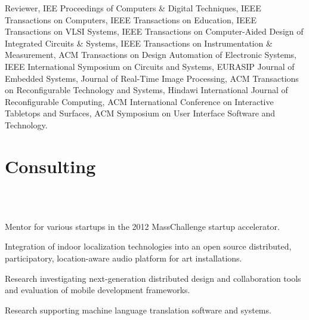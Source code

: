 \documentclass[line]{res}
\begin{document}
\begin{resume}
	Reviewer, IEE Proceedings of Computers \& Digital Techniques, IEEE Transactions on Computers, IEEE Transactions on Education, IEEE Transactions on VLSI Systems, IEEE Transactions on Computer-Aided Design of Integrated Circuits \& Systems, IEEE Transactions on Instrumentation \& Measurement, ACM Transactions on Design Automation of Electronic Systems, IEEE International Symposium on Circuits and Systems, EURASIP Journal of Embedded Systems, Journal of Real-Time Image Processing, ACM Transactions on Reconfigurable Technology and Systems, Hindawi International Journal of Reconfigurable Computing, ACM International Conference on Interactive Tabletops and Surfaces, ACM Symposium on User Interface Software and Technology.
	
	\section{\sc Consulting}
	\begin{format}
		\\
		\body\\
	\end{format}

	\begin{position}
		Mentor for various startups in the 2012 MassChallenge startup accelerator.
	\end{position}
	
	\begin{position}
		Integration of indoor localization technologies into an open source distributed, participatory, location-aware audio platform for art installations.
	\end{position}
	
	\begin{position}
		Research investigating next-generation distributed design and collaboration tools and evaluation of mobile development frameworks.
	\end{position}
	
	\begin{position}
		Research supporting machine language translation software and systems. 
	\end{position}
	

\end{resume}
\end{document}
